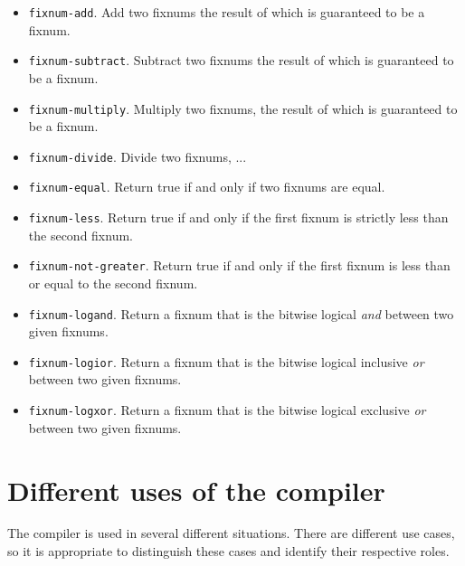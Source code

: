 \begin{itemize}
\item \texttt{fixnum-add}.  Add two fixnums the result of which is
  guaranteed to be a fixnum.
\item \texttt{fixnum-subtract}.  Subtract two fixnums the result of
  which is guaranteed to be a fixnum.
\item \texttt{fixnum-multiply}.  Multiply two fixnums, the result of
  which is guaranteed to be a fixnum.
\item \texttt{fixnum-divide}.  Divide two fixnums, ...
\item \texttt{fixnum-equal}.  Return true if and only if two fixnums
  are equal.
\item \texttt{fixnum-less}.  Return true if and only if the first
  fixnum is strictly less than the second fixnum.
\item \texttt{fixnum-not-greater}.  Return true if and only if the first
  fixnum is less than or equal to the second fixnum.
\item \texttt{fixnum-logand}.  Return a fixnum that is the bitwise
  logical \emph{and} between two given fixnums.
\item \texttt{fixnum-logior}.  Return a fixnum that is the bitwise
  logical inclusive \emph{or} between two given fixnums.
\item \texttt{fixnum-logxor}.  Return a fixnum that is the bitwise
  logical exclusive \emph{or} between two given fixnums.
\end{itemize}


\section{Different uses of the compiler}
\label{sec-different-uses-of-the-compiler}

The compiler is used in several different situations.  There are
different use cases, so it is appropriate to distinguish these cases
and identify their respective roles.

